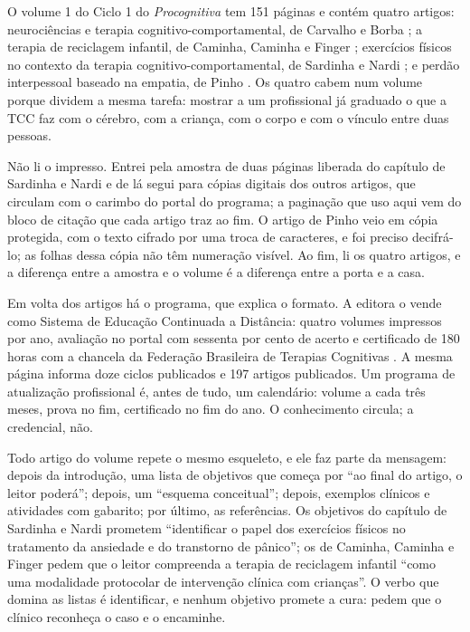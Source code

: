 \documentclass[12pt]{article}
\begin{document}
O volume 1 do Ciclo 1 do \emph{Procognitiva} tem 151 páginas e contém quatro artigos: neurociências e terapia cognitivo-comportamental, de Carvalho e Borba \cite{carvalho-borba}; a terapia de reciclagem infantil, de Caminha, Caminha e Finger \cite{caminha}; exercícios físicos no contexto da terapia cognitivo-comportamental, de Sardinha e Nardi \cite{sardinha-nardi}; e perdão interpessoal baseado na empatia, de Pinho \cite{pinho}. Os quatro cabem num volume porque dividem a mesma tarefa: mostrar a um profissional já graduado o que a TCC faz com o cérebro, com a criança, com o corpo e com o vínculo entre duas pessoas.

Não li o impresso. Entrei pela amostra de duas páginas liberada do capítulo de Sardinha e Nardi e de lá segui para cópias digitais dos outros artigos, que circulam com o carimbo do portal do programa; a paginação que uso aqui vem do bloco de citação que cada artigo traz ao fim. O artigo de Pinho veio em cópia protegida, com o texto cifrado por uma troca de caracteres, e foi preciso decifrá-lo; as folhas dessa cópia não têm numeração visível. Ao fim, li os quatro artigos, e a diferença entre a amostra e o volume é a diferença entre a porta e a casa.

Em volta dos artigos há o programa, que explica o formato. A editora o vende como Sistema de Educação Continuada a Distância: quatro volumes impressos por ano, avaliação no portal com sessenta por cento de acerto e certificado de 180 horas com a chancela da Federação Brasileira de Terapias Cognitivas \cite{secad}. A mesma página informa doze ciclos publicados e 197 artigos publicados. Um programa de atualização profissional é, antes de tudo, um calendário: volume a cada três meses, prova no fim, certificado no fim do ano. O conhecimento circula; a credencial, não.

Todo artigo do volume repete o mesmo esqueleto, e ele faz parte da mensagem: depois da introdução, uma lista de objetivos que começa por ``ao final do artigo, o leitor poderá''; depois, um ``esquema conceitual''; depois, exemplos clínicos e atividades com gabarito; por último, as referências. Os objetivos do capítulo de Sardinha e Nardi prometem ``identificar o papel dos exercícios físicos no tratamento da ansiedade e do transtorno de pânico''; os de Caminha, Caminha e Finger pedem que o leitor compreenda a terapia de reciclagem infantil ``como uma modalidade protocolar de intervenção clínica com crianças''. O verbo que domina as listas é identificar, e nenhum objetivo promete a cura: pedem que o clínico reconheça o caso e o encaminhe.
\end{document}
